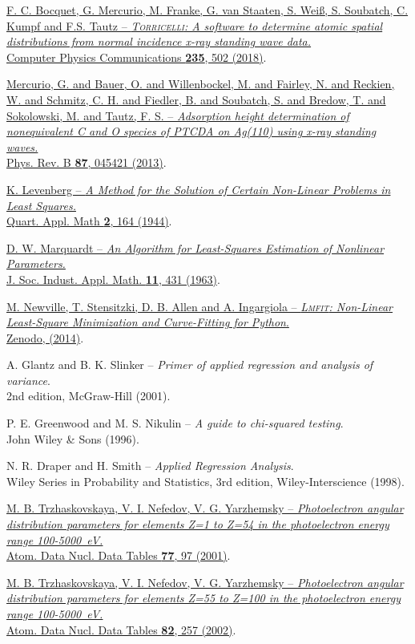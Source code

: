 \documentclass[oldfontcommands,openany,oneside]{memoir}
\newcommand{\myref}[7]{\href{http://dx.doi.org/#7}{#1 -- \emph{#2.}\\ #3 \textbf{#4}, #5 (#6)}.}
\begin{document}
\begin{thebibliography}{99} %
 \myref{F. C. Bocquet, G. Mercurio, M. Franke, G. van Staaten, S. Wei{\ss}, S. Soubatch, C. Kumpf and F.S. Tautz}{\textsc{Torricelli}: A software to determine atomic spatial distributions from normal incidence x-ray standing wave data}{Computer Physics Communications}{235}{502}{2018}{10.1016/j.cpc.2018.06.009}

 \myref{Mercurio, G. and Bauer, O. and Willenbockel, M. and Fairley, N. and Reckien, W. and Schmitz, C. H. and Fiedler, B. and Soubatch, S. and Bredow, T. and Sokolowski, M. and Tautz, F. S.} {Adsorption height determination of nonequivalent C and O species of PTCDA on Ag(110) using x-ray standing waves}{Phys. Rev. B}{87}{045421}{2013}{10.1103/PhysRevB.87.045421}

 \myref{K. Levenberg}{A Method for the Solution of Certain Non-Linear Problems in Least Squares}{Quart. Appl. Math}{2}{164}{1944}{10.1090/qam/10666}

 \myref{D. W. Marquardt}{An Algorithm for Least-Squares Estimation of Nonlinear Parameters}{J. Soc. Indust. Appl. Math.}{11}{431}{1963}{10.1137/0111030}

 \href{http://dx.doi.org/10.5281/zenodo.11813}{M. Newville, T. Stensitzki, D. B. Allen and A. Ingargiola -- \emph{\textsc{Lmfit}: Non-Linear Least-Square Minimization and Curve-Fitting for Python}.\\ Zenodo, (2014)}.

 A. Glantz and B. K. Slinker -- \emph{Primer of applied regression and analysis of variance}.\\ 2nd edition, McGraw-Hill (2001).

   P. E. Greenwood and M. S. Nikulin -- \emph{A guide to chi-squared testing}.\\ John Wiley \& Sons (1996).
  
 N. R. Draper and H. Smith -- \emph{Applied Regression Analysis}.\\ Wiley Series in Probability and Statistics, 3rd edition, Wiley-Interscience (1998).


 \myref{M. B. Trzhaskovskaya, V. I. Nefedov, V. G. Yarzhemsky}{Photoelectron angular distribution parameters for elements Z=1 to Z=54 in the photoelectron energy range 100-5000~eV}{Atom. Data Nucl. Data Tables}{77}{97}{2001}{10.1006/adnd.2000.0849}

 \myref{M. B. Trzhaskovskaya, V. I. Nefedov, V. G. Yarzhemsky}{Photoelectron angular distribution parameters for elements Z=55 to Z=100 in the photoelectron energy range 100-5000~eV}{Atom. Data Nucl. Data Tables}{82}{257}{2002}{10.1006/adnd.2002.0886}
\end{thebibliography}
\end{document}
